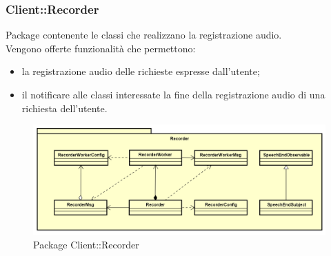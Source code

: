 \subsubsection{Client::Recorder}
Package contenente le classi che realizzano la registrazione audio.\\
Vengono offerte funzionalità che permettono:
\begin{itemize}
\item la registrazione audio delle richieste espresse dall'utente;
\item il notificare alle classi interessate la fine della registrazione audio di una richiesta dell'utente.
\end{itemize}
\begin{figure}[h] \centering \includegraphics[width=\textwidth,height=\textheight,keepaspectratio]{images/diagrams/client/Client/Recorder.png}
	\caption{Package Client::Recorder}
\end{figure}
\newpage

